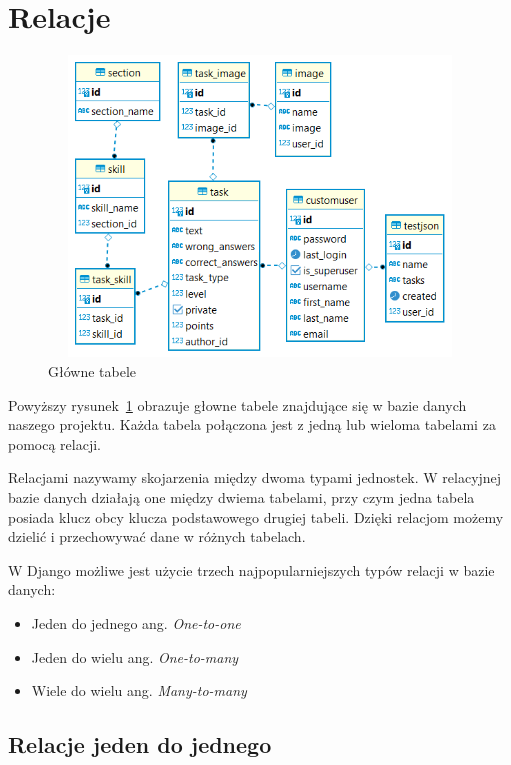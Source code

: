 \documentclass[oneside,polski,logo,indent]{amuthesis}
\begin{document}
\section{Relacje}

\begin{figure}[H]
  \centering
  \includegraphics[width=12cm, height=8cm]{gl-relacje.png}
  \caption{Główne tabele}
  \label{relacje}
\end{figure}

\noindent Powyższy rysunek~\ref{relacje} obrazuje głowne tabele znajdujące się w bazie danych naszego projektu. Każda tabela połączona jest z jedną lub wieloma tabelami za pomocą relacji.

Relacjami nazywamy skojarzenia między dwoma typami jednostek. W relacyjnej bazie danych działają one między dwiema tabelami, przy czym jedna tabela posiada klucz obcy klucza podstawowego drugiej tabeli. Dzięki relacjom możemy dzielić i przechowywać dane w różnych tabelach.

W Django możliwe jest użycie trzech najpopularniejszych typów relacji w bazie danych:
\begin{itemize}
\item Jeden do jednego ang. \emph{One-to-one}
\item Jeden do wielu ang. \emph{One-to-many}
\item Wiele do wielu ang. \emph{Many-to-many}

\end{itemize}


\begin{center}
\subsection{Relacje jeden do jednego}
\end{center}
\end{document}
